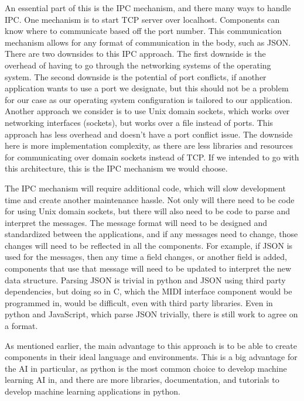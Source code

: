 An essential part of this is the IPC mechanism, and there many ways to handle IPC. One
mechanism is to start TCP server over localhost. Components can know where to communicate
based off the port number. This communication mechanism allows for any format of
communication in the body, such as JSON. There are two downsides to this IPC approach. The
first downside is the overhead of having to go through the networking systems of the
operating system. The second downside is the potential of port conflicts, if another
application wants to use a port we designate, but this should not be a problem for our
case as our operating system configuration is tailored to our application. Another
approach we consider is to use Unix domain sockets, which works over networking interfaces
(sockets), but works over a file instead of ports. This approach has less overhead and
doesn't have a port conflict issue. The downside here is more implementation complexity,
as there are less libraries and resources for communicating over domain sockets instead of
TCP. If we intended to go with this architecture, this is the IPC mechanism we would
choose.

The IPC mechanism will require additional code, which will slow development time and
create another maintenance hassle. Not only will there need to be code for using Unix
domain sockets, but there will also need to be code to parse and interpret the messages.
The message format will need to be designed and standardized between the applications, and
if any messages need to change, those changes will need to be reflected in all the
components. For example, if JSON is used for the messages, then any time a field changes,
or another field is added, components that use that message will need to be updated to
interpret the new data structure. Parsing JSON is trivial in python and JSON using third
party dependencies, but doing so in C, which the MIDI interface component would be
programmed in, would be difficult, even with third party libraries. Even in python and
JavaScript, which parse JSON trivially, there is still work to agree on a format.

As mentioned earlier, the main advantage to this approach is to be able to create
components in their ideal language and environments. This is a big advantage for the AI in
particular, as python is the most common choice to develop machine learning AI in, and
there are more libraries, documentation, and tutorials to develop machine learning
applications in python.

